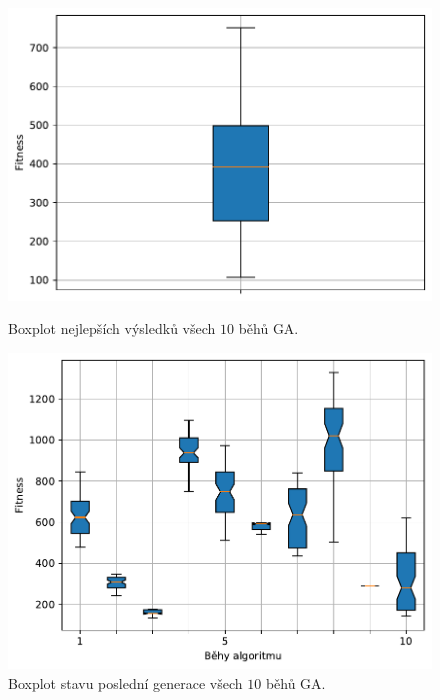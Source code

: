 \begin{figure}[H]
\begin{minipage}[t]{0.475\linewidth}
\includegraphics[width=\linewidth]{obrazky-figures/statistics/HIFU/flower/15/GA/bestsBoxplot_WithOutliers.pdf}
\caption{Boxplot nejlepších výsledků všech $10$ běhů GA.}
\label{fg:hifu:flower:ga:best}
\end{minipage}
\hfill
\begin{minipage}[t]{0.475\linewidth}
\includegraphics[width=\linewidth]{obrazky-figures/statistics/HIFU/flower/15/GA/lastGenBoxplots.pdf}
\caption{Boxplot stavu poslední generace všech $10$ běhů GA.}
\label{fg:hifu:flower:ga:lastGen}
\end{minipage}
\end{figure}



